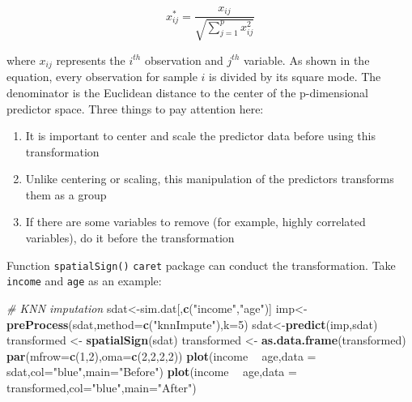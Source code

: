 \documentclass[
]{article}
\newenvironment{Shaded}{\begin{snugshade}}{\end{snugshade}}
\newcommand{\CommentTok}[1]{\textcolor[rgb]{0.56,0.35,0.01}{\textit{#1}}}
\newcommand{\DataTypeTok}[1]{\textcolor[rgb]{0.13,0.29,0.53}{#1}}
\newcommand{\DecValTok}[1]{\textcolor[rgb]{0.00,0.00,0.81}{#1}}
\newcommand{\KeywordTok}[1]{\textcolor[rgb]{0.13,0.29,0.53}{\textbf{#1}}}
\newcommand{\NormalTok}[1]{#1}
\newcommand{\OperatorTok}[1]{\textcolor[rgb]{0.81,0.36,0.00}{\textbf{#1}}}
\newcommand{\StringTok}[1]{\textcolor[rgb]{0.31,0.60,0.02}{#1}}
\providecommand{\tightlist}{%
  \setlength{\itemsep}{0pt}\setlength{\parskip}{0pt}}
\begin{document}
\[x_{ij}^{*}=\frac{x_{ij}}{\sqrt{\sum_{j=1}^{p}x_{ij}^{2}}}\]

where \(x_{ij}\) represents the \(i^{th}\) observation and \(j^{th}\)
variable. As shown in the equation, every observation for sample \(i\)
is divided by its square mode. The denominator is the Euclidean distance
to the center of the p-dimensional predictor space. Three things to pay
attention here:

\begin{enumerate}
\def\labelenumi{\arabic{enumi}.}
\tightlist
\item
  It is important to center and scale the predictor data before using
  this transformation
\item
  Unlike centering or scaling, this manipulation of the predictors
  transforms them as a group
\item
  If there are some variables to remove (for example, highly correlated
  variables), do it before the transformation
\end{enumerate}

Function \texttt{spatialSign()} \texttt{caret} package can conduct the
transformation. Take \texttt{income} and \texttt{age} as an example:

\begin{Shaded}
\begin{Highlighting}[]
\CommentTok{# KNN imputation}
\NormalTok{sdat<-sim.dat[,}\KeywordTok{c}\NormalTok{(}\StringTok{"income"}\NormalTok{,}\StringTok{"age"}\NormalTok{)]}
\NormalTok{imp<-}\KeywordTok{preProcess}\NormalTok{(sdat,}\DataTypeTok{method=}\KeywordTok{c}\NormalTok{(}\StringTok{"knnImpute"}\NormalTok{),}\DataTypeTok{k=}\DecValTok{5}\NormalTok{)}
\NormalTok{sdat<-}\KeywordTok{predict}\NormalTok{(imp,sdat)}
\NormalTok{transformed <-}\StringTok{ }\KeywordTok{spatialSign}\NormalTok{(sdat)}
\NormalTok{transformed <-}\StringTok{ }\KeywordTok{as.data.frame}\NormalTok{(transformed)}
\KeywordTok{par}\NormalTok{(}\DataTypeTok{mfrow=}\KeywordTok{c}\NormalTok{(}\DecValTok{1}\NormalTok{,}\DecValTok{2}\NormalTok{),}\DataTypeTok{oma=}\KeywordTok{c}\NormalTok{(}\DecValTok{2}\NormalTok{,}\DecValTok{2}\NormalTok{,}\DecValTok{2}\NormalTok{,}\DecValTok{2}\NormalTok{))}
\KeywordTok{plot}\NormalTok{(income }\OperatorTok{~}\StringTok{ }\NormalTok{age,}\DataTypeTok{data =}\NormalTok{ sdat,}\DataTypeTok{col=}\StringTok{"blue"}\NormalTok{,}\DataTypeTok{main=}\StringTok{"Before"}\NormalTok{)}
\KeywordTok{plot}\NormalTok{(income }\OperatorTok{~}\StringTok{ }\NormalTok{age,}\DataTypeTok{data =}\NormalTok{ transformed,}\DataTypeTok{col=}\StringTok{"blue"}\NormalTok{,}\DataTypeTok{main=}\StringTok{"After"}\NormalTok{)}
\end{Highlighting}
\end{Shaded}
\end{document}
